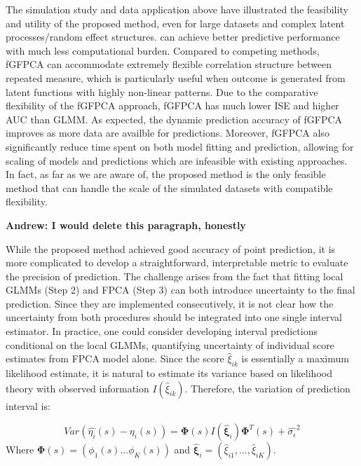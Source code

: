 \documentclass[
  11pt,
]{article}
\begin{document}
The simulation study and data application above have illustrated the
feasibility and utility of the proposed method, even for large datasets
and complex latent processes/random effect structures. can achieve
better predictive performance with much less computational burden.
Compared to competing methods, fGFPCA can accommodate extremely flexible
correlation structure between repeated measure, which is particularly
useful when outcome is generated from latent functions with highly
non-linear patterns. Due to the comparative flexibility of the fGFPCA
approach, fGFPCA has much lower ISE and higher AUC than GLMM. As
expected, the dynamic prediction accuracy of fGFPCA improves as more
data are availble for predictions. Moreover, fGFPCA also significantly
reduce time spent on both model fitting and prediction, allowing for
scaling of models and predictions which are infeasible with existing
approaches. In fact, as far as we are aware of, the proposed method is
the only feasible method that can handle the scale of the simulated
datasets with compatible flexibility.

\textbf{Andrew: I would delete this paragraph, honestly}

While the proposed method achieved good accuracy of point prediction, it
is more complicated to develop a straightforward, interpretable metric
to evaluate the precision of prediction. The challenge arises from the
fact that fitting local GLMMs (Step 2) and FPCA (Step 3) can both
introduce uncertainty to the final prediction. Since they are
implemented consecutively, it is not clear how the uncertainty from both
procedures should be integrated into one single interval estimator. In
practice, one could consider developing interval predictions conditional
on the local GLMMs, quantifying uncertainty of individual score
estimates from FPCA model alone. Since the score \(\hat{\xi}_{ik}\) is
essentially a maximum likelihood estimate, it is natural to estimate its
variance based on likelihood theory with observed information
\({I}(\hat{\xi}_{ik})\). Therefore, the variation of prediction interval
is:

\[Var(\hat{\eta_i}(s)-\eta_i(s))=\boldsymbol{\Phi}(s)I(\hat{\boldsymbol{\xi}}_i)\boldsymbol{\Phi}^T(s)+\hat{\sigma_{\epsilon}}^2\]
Where \(\boldsymbol{\Phi}(s)=(\phi_1(s)...\phi_K(s))\) and
\(\hat{\boldsymbol{\xi}}_i=(\hat{\xi}_{i1}, ...,\hat{\xi}_{iK})\).
\end{document}
